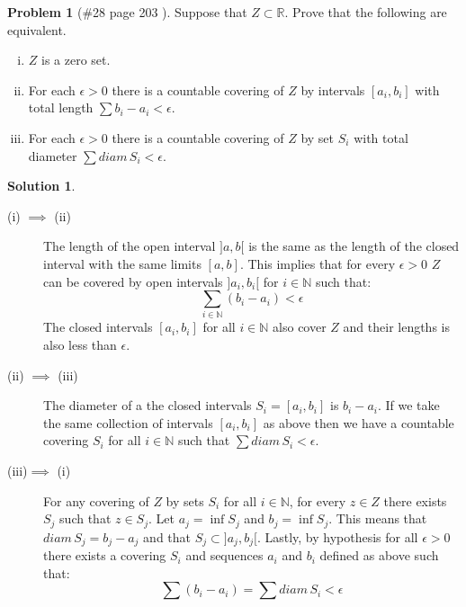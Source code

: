 \documentclass{article}
\theoremstyle{definition}
\newtheorem*{soln}{Solution}
\newtheorem*{prob}{Problem}
\theoremstyle{theorem}
\newcommand{\R}{\mathbb{R}}
\newcommand{\N}{\mathbb{N}}
\begin{document}
\begin{prob}[\#28 page 203   ]
    Suppose that $Z\subset \R$. Prove that the following are equivalent.
    \begin{enumerate}[(i)]
        \item $Z$ is a zero set.
        \item For each $\epsilon>0$ there is a countable covering of $Z$ by intervals $[a_i, b_i]$ with total length $\sum b_i - a_i <\epsilon$.
        \item For each $\epsilon>0$ there is a countable covering of $Z$ by set $S_i$ with total diameter $\sum diam\, S_i <\epsilon$.

    \end{enumerate}
\end{prob}
\begin{soln}
\begin{description}
    \item[(i) $\implies$ (ii)] The length of the open interval $]a,b[$ is the same as the length of the closed interval with the same limits $[a,b]$. This implies that for every $\epsilon >0$ $Z$ can be covered by open intervals $]a_i,b_i[$ for $i\in \N$ such that:
        $$\sum_{i\in \N }(b_i-a_i)<\epsilon $$
        The closed intervals $[a_i,b_i]$ for all $i\in \N$ also cover $Z$ and their lengths is also less than $\epsilon$.
    \item[(ii) $\implies$ (iii)] The diameter of a the closed intervals $S_i = [a_i, b_i]$ is $b_i -a_i$. If we take the same collection of intervals $[a_i,b_i]$ as above then we have a countable covering $S_i$ for all $i\in \N$ such that $\sum diam\, S_i <\epsilon$.
    \item[(iii)$\implies$ (i)] For any covering of $Z$ by sets $S_i$ for all $i\in \N$, for every $z\in Z$ there exists $S_j$ such that $z\in S_j$.  Let $a_j= \inf S_j$ and $b_j = \inf S_j$. This means that $diam \, S_j = b_j-a_j$ and that $S_j \subset ]a_j, b_j[$. Lastly, by hypothesis for all $\epsilon >0$  there exists a covering $S_i$  and sequences $a_i$ and $b_i$ defined as above such that:
        $$\sum (b_i - a_i) = \sum diam\, S_i < \epsilon$$
\end{description}
\end{soln}
\vspace{1in}
\end{document}
